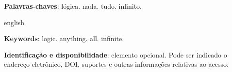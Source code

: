\maketitle

\begin{resumoumacoluna}
	\lipsum[2]
 
 \vspace{\onelineskip}
 
 \noindent
 \textbf{Palavras-chaves}: lógica. nada. tudo. infinito.
\end{resumoumacoluna}


\renewcommand{\resumoname}{Abstract}
\begin{resumoumacoluna}
 \begin{otherlanguage*}{english}
	\lipsum[2]

	\vspace{\onelineskip}
 
	\noindent
	\textbf{Keywords}: logic. anything. all. infinite.
 \end{otherlanguage*}  
\end{resumoumacoluna}

\begin{center}\smaller
\textbf{Identificação e disponibilidade}: elemento opcional. Pode ser indicado 
o endereço eletrônico, DOI, suportes e outras informações relativas ao acesso.
\end{center}